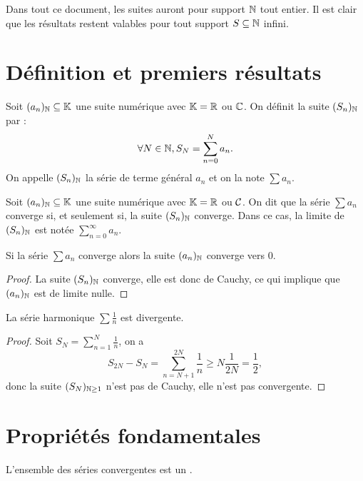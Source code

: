 \documentclass[french]{article}
\begin{document}
Dans tout ce document, les suites auront pour support $\mathbb{N}$ tout entier. Il est clair que les résultats restent valables pour tout support 
$S \subseteq \mathbb{N}$ infini.

\section{Définition et premiers résultats}

\begin{defn}[Série]
Soit $(a_n)_{\mathbb{N}} \subseteq \mathbb{K}$ une suite numérique avec $\mathbb{K} = \mathbb{R}$ ou $\mathbb{C}$. 
On définit la suite $(S_n)_{\mathbb{N}}$ par :
\[ \forall N \in \mathbb{N}, S_N = \sum_{n=0}^N a_n . \]
On appelle $(S_n)_{\mathbb{N}}$ la série de terme général $a_n$ et on la note $\sum a_n$.
\end{defn}

\begin{defn}[Convergence]
Soit $(a_n)_{\mathbb{N}} \subseteq \mathbb{K}$ une suite numérique avec $\mathbb{K} = \mathbb{R}$ ou $\mathcal{C}$. 
On dit que la série $\sum a_n$ converge si, et seulement si, la suite $(S_n)_{\mathbb{N}}$ converge.
Dans ce cas, la limite de $(S_n)_{\mathbb{N}}$ est notée $\sum_{n=0}^{\infty} a_n$.
\end{defn}

\begin{thm}
Si la série $\sum a_n$ converge alors la suite $(a_n)_{\mathbb{N}}$ converge vers 0.
\end{thm}

\begin{proof}
La suite $(S_n)_{\mathbb{N}}$ converge, elle est donc de Cauchy, ce qui implique que $(a_n)_{\mathbb{N}}$ est de limite nulle.
\end{proof}

\begin{coro}
La série harmonique $\sum \frac1{n}$ est divergente.
\end{coro}

\begin{proof}
Soit $S_N = \sum_{n=1}^N\frac{1}{n} $, on a 
\[ S_{2N} - S_N = \sum_{n=N+1}^{2N} \dfrac{1}{n} \geq N \dfrac1{2N} = \dfrac12 , \]
donc la suite $(S_N)_{\mathbb{N} \geq 1}$ n'est pas de Cauchy, elle n'est pas convergente.
\end{proof}

\section{Propriétés fondamentales}

\begin{thm}[Linéarité]
L'ensemble des séries convergentes est un \Kev.
\end{thm}
\end{document}
